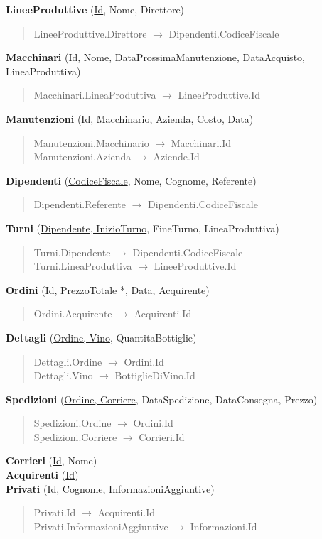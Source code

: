 \textbf{LineeProduttive} (\underline{Id}, Nome, Direttore)
\begin{verse}
	LineeProduttive.Direttore $\to$ Dipendenti.CodiceFiscale
\end{verse} 
\textbf{Macchinari} (\underline{Id}, Nome, DataProssimaManutenzione, DataAcquisto, LineaProduttiva)
\begin{verse}
	Macchinari.LineaProduttiva $\to$ LineeProduttive.Id
\end{verse} 
\textbf{Manutenzioni} (\underline{Id}, Macchinario, Azienda, Costo, Data)
\begin{verse}
	Manutenzioni.Macchinario $\to$ Macchinari.Id\\
	Manutenzioni.Azienda $\to$ Aziende.Id
\end{verse}
\textbf{Dipendenti} (\underline{CodiceFiscale}, Nome, Cognome, Referente)
\begin{verse}
	Dipendenti.Referente $\to$ Dipendenti.CodiceFiscale
\end{verse} 
\textbf{Turni} (\underline{Dipendente, InizioTurno}, FineTurno, LineaProduttiva)
\begin{verse}
	Turni.Dipendente $\to$ Dipendenti.CodiceFiscale\\
	Turni.LineaProduttiva $\to$ LineeProduttive.Id
\end{verse} 
\textbf{Ordini} (\underline{Id}, PrezzoTotale *, Data, Acquirente)
\begin{verse}
	Ordini.Acquirente $\to$ Acquirenti.Id
\end{verse} 
\textbf{Dettagli} (\underline{Ordine, Vino}, QuantitaBottiglie)
\begin{verse}
	Dettagli.Ordine $\to$ Ordini.Id\\
	Dettagli.Vino $\to$ BottiglieDiVino.Id
\end{verse} 
\textbf{Spedizioni} (\underline{Ordine, Corriere}, DataSpedizione, DataConsegna, Prezzo)
\begin{verse}
	Spedizioni.Ordine $\to$ Ordini.Id\\
	Spedizioni.Corriere $\to$ Corrieri.Id
\end{verse} 
\textbf{Corrieri} (\underline{Id}, Nome)\\
\textbf{Acquirenti} (\underline{Id})\\
\textbf{Privati} (\underline{Id}, Cognome, InformazioniAggiuntive)
\begin{verse}
	Privati.Id $\to$ Acquirenti.Id\\
	Privati.InformazioniAggiuntive $\to$ Informazioni.Id
\end{verse} 
